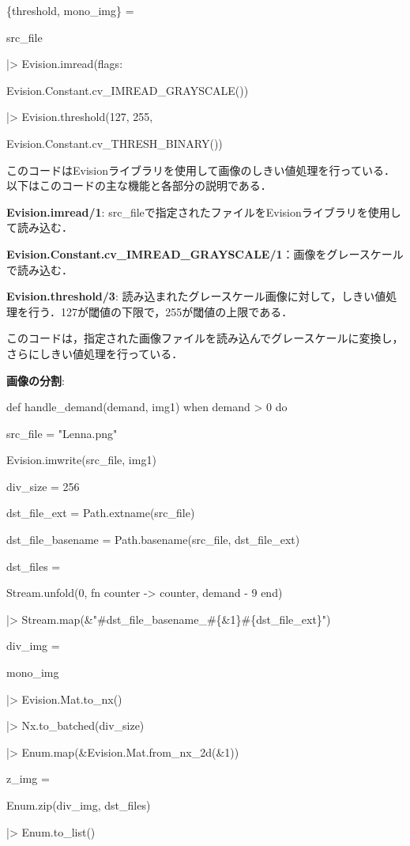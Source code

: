 \documentclass[a4paper]{jreport}	%
\begin{document}
\{threshold, mono\_img\} =

  src\_file

  |> Evision.imread(flags:
  
  Evision.Constant.cv\_IMREAD\_GRAYSCALE())
  
  |> Evision.threshold(127, 255, 
  
  Evision.Constant.cv\_THRESH\_BINARY())

このコードはEvisionライブラリを使用して画像のしきい値処理を行っている．以下はこのコードの主な機能と各部分の説明である．

\textbf{Evision.imread/1}: src\_fileで指定されたファイルをEvisionライブラリを使用して読み込む．

\textbf{Evision.Constant.cv\_IMREAD\_GRAYSCALE/1}：画像をグレースケールで読み込む．

\textbf{Evision.threshold/3}: 読み込まれたグレースケール画像に対して，しきい値処理を行う．127が閾値の下限で，255が閾値の上限である．

このコードは，指定された画像ファイルを読み込んでグレースケールに変換し，さらにしきい値処理を行っている．

\textbf{画像の分割}:

def handle\_demand(demand, img1) when demand > 0 do   

    src\_file = "Lenna.png"
    
    Evision.imwrite(src\_file, img1)
    
    div\_size = 256
    
    dst\_file\_ext = Path.extname(src\_file)
    
    dst\_file\_basename = Path.basename(src\_file, dst\_file\_ext)
    
    dst\_files =
    
      Stream.unfold(0, fn counter -> {counter, demand - 9} end)
      
      |> Stream.map(\&"\#{dst\_file\_basename}\_\#\{\&1\}\#\{dst\_file\_ext\}")
    
    div\_img =
    
    mono\_img
    
    |> Evision.Mat.to\_nx()
    
    |> Nx.to\_batched(div\_size)
    
    |> Enum.map(\&Evision.Mat.from\_nx\_2d(\&1))
    
    z\_img = 
    
    Enum.zip(div\_img, dst\_files)
    
    |> Enum.to\_list()
    
\end{document}
